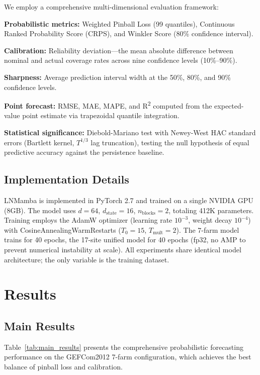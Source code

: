 \documentclass[review]{elsarticle}
\begin{document}
We employ a comprehensive multi-dimensional evaluation framework:

\textbf{Probabilistic metrics:} Weighted Pinball Loss (99 quantiles), Continuous Ranked Probability Score (CRPS), and Winkler Score (80\% confidence interval).

\textbf{Calibration:} Reliability deviation---the mean absolute difference between nominal and actual coverage rates across nine confidence levels (10\%--90\%).

\textbf{Sharpness:} Average prediction interval width at the 50\%, 80\%, and 90\% confidence levels.

\textbf{Point forecast:} RMSE, MAE, MAPE, and R\textsuperscript{2} computed from the expected-value point estimate via trapezoidal quantile integration.

\textbf{Statistical significance:} Diebold-Mariano test with Newey-West HAC standard errors (Bartlett kernel, $T^{1/3}$ lag truncation), testing the null hypothesis of equal predictive accuracy against the persistence baseline.

\subsection{Implementation Details}

LNMamba is implemented in PyTorch 2.7 and trained on a single NVIDIA GPU (8GB). The model uses $d=64$, $d_{\text{state}}=16$, $n_{\text{blocks}}=2$, totaling 412K parameters. Training employs the AdamW optimizer (learning rate $10^{-3}$, weight decay $10^{-4}$) with CosineAnnealingWarmRestarts ($T_0=15$, $T_{\text{mult}}=2$). The 7-farm model trains for 40 epochs, the 17-site unified model for 40 epochs (fp32, no AMP to prevent numerical instability at scale). All experiments share identical model architecture; the only variable is the training dataset.

\section{Results}

\subsection{Main Results}

Table~\ref{tab:main_results} presents the comprehensive probabilistic forecasting performance on the GEFCom2012 7-farm configuration, which achieves the best balance of pinball loss and calibration.
\end{document}
